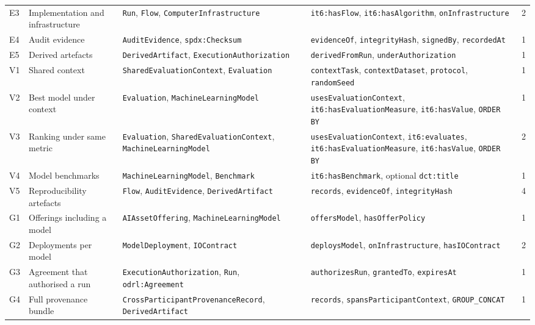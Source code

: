 \documentclass[Afour,sagev,times]{sagej}
\newcommand{\code}[1]{\texttt{#1}}
\begin{document}
\begin{table}[tb]
\begin{tabular}{@{}p{0.8cm}p{3.8cm}p{4.0cm}p{4.9cm}r@{}}
E3 & Implementation and infrastructure & \code{Run}, \code{Flow}, \code{ComputerInfrastructure} & \code{it6:hasFlow}, \code{it6:hasAlgorithm}, \code{onInfrastructure} & 2 \\
E4 & Audit evidence & \code{AuditEvidence}, \code{spdx:Checksum} & \code{evidenceOf}, \code{integrityHash}, \code{signedBy}, \code{recordedAt} & 1 \\
E5 & Derived artefacts & \code{DerivedArtifact}, \code{ExecutionAuthorization} & \code{derivedFromRun}, \code{underAuthorization} & 1 \\
V1 & Shared context & \code{SharedEvaluationContext}, \code{Evaluation} & \code{contextTask}, \code{contextDataset}, \code{protocol}, \code{randomSeed} & 1 \\
V2 & Best model under context & \code{Evaluation}, \code{MachineLearningModel} & \code{usesEvaluationContext}, \code{it6:hasEvaluationMeasure}, \code{it6:hasValue}, \code{ORDER BY} & 1 \\
V3 & Ranking under same metric & \code{Evaluation}, \code{SharedEvaluationContext}, \code{MachineLearningModel} & \code{usesEvaluationContext}, \code{it6:evaluates}, \code{it6:hasEvaluationMeasure}, \code{it6:hasValue}, \code{ORDER BY} & 2 \\
V4 & Model benchmarks & \code{MachineLearningModel}, \code{Benchmark} & \code{it6:hasBenchmark}, optional \code{dct:title} & 1 \\
V5 & Reproducibility artefacts & \code{Flow}, \code{AuditEvidence}, \code{DerivedArtifact} & \code{records}, \code{evidenceOf}, \code{integrityHash} & 4 \\
G1 & Offerings including a model & \code{AIAssetOffering}, \code{MachineLearningModel} & \code{offersModel}, \code{hasOfferPolicy} & 1 \\
G2 & Deployments per model & \code{ModelDeployment}, \code{IOContract} & \code{deploysModel}, \code{onInfrastructure}, \code{hasIOContract} & 2 \\
G3 & Agreement that authorised a run & \code{ExecutionAuthorization}, \code{Run}, \code{odrl:Agreement} & \code{authorizesRun}, \code{grantedTo}, \code{expiresAt} & 1 \\
G4 & Full provenance bundle & \code{CrossParticipant}\newline\code{ProvenanceRecord}, \code{DerivedArtifact} & \code{records}, \code{spansParticipantContext}, \code{GROUP\_CONCAT} & 1 \\
\bottomrule
\end{tabular}
\end{table}
\end{document}
